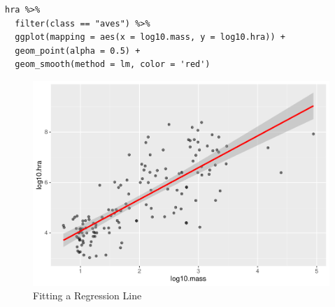 \begin{enumerate}
\begin{lstlisting}
hra %>%
  filter(class == "aves") %>%
  ggplot(mapping = aes(x = log10.mass, y = log10.hra)) +
  geom_point(alpha = 0.5) +
  geom_smooth(method = lm, color = 'red')
\end{lstlisting}

\begin{figure}[h]
  \includegraphics{figures/practice/fit-line-1.pdf}
  \caption{Fitting a Regression Line}
  \label{fig:fit-line-1}
\end{figure}

\end{enumerate}
